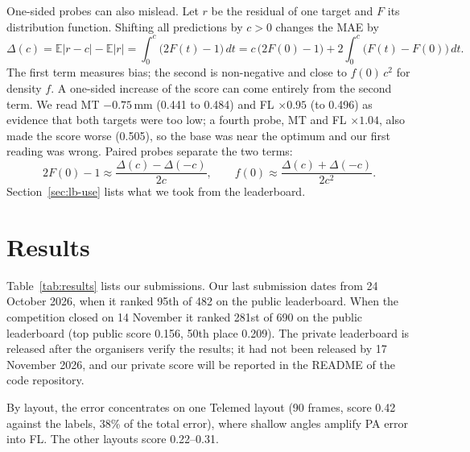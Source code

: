 \documentclass[11pt,a4paper]{article}
\begin{document}
One-sided probes can also mislead. Let $r$ be the residual of one target and $F$ its distribution function. Shifting all predictions by $c>0$ changes the MAE by
\begin{equation}
\Delta(c) = \mathbb{E}|r-c| - \mathbb{E}|r| = \int_0^c \bigl(2F(t)-1\bigr)\,dt = c\,\bigl(2F(0)-1\bigr) + 2\int_0^c \bigl(F(t)-F(0)\bigr)\,dt .
\end{equation}
The first term measures bias; the second is non-negative and close to $f(0)\,c^2$ for density $f$. A one-sided increase of the score can come entirely from the second term. We read MT $-0.75$\,mm (0.441 to 0.484) and FL $\times0.95$ (to 0.496) as evidence that both targets were too low; a fourth probe, MT and FL $\times1.04$, also made the score worse (0.505), so the base was near the optimum and our first reading was wrong. Paired probes separate the two terms:
\begin{equation}
2F(0)-1 \approx \frac{\Delta(c)-\Delta(-c)}{2c},\qquad f(0) \approx \frac{\Delta(c)+\Delta(-c)}{2c^2}.
\end{equation}
Section~\ref{sec:lb-use} lists what we took from the leaderboard.

\section{Results}

Table~\ref{tab:results} lists our submissions. Our last submission dates from 24 October 2026, when it ranked 95th of 482 on the public leaderboard. When the competition closed on 14 November it ranked 281st of 690 on the public leaderboard (top public score 0.156, 50th place 0.209). The private leaderboard is released after the organisers verify the results; it had not been released by 17 November 2026, and our private score will be reported in the README of the code repository.

By layout, the error concentrates on one Telemed layout (90 frames, score 0.42 against the labels, 38\% of the total error), where shallow angles amplify PA error into FL. The other layouts score 0.22--0.31.
\end{document}
